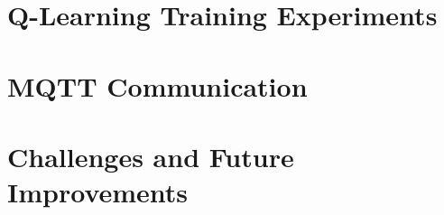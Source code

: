 \documentclass[a4paper,12pt]{article}
\begin{document}
\newpage
\section{Q-Learning Training Experiments}\label{sec:qlearning}



\newpage
\section{MQTT Communication}\label{sec:mqtt-communication}
  

\newpage
\newpage\section{Challenges and Future Improvements}\label{sec:limitations}

\end{document}
